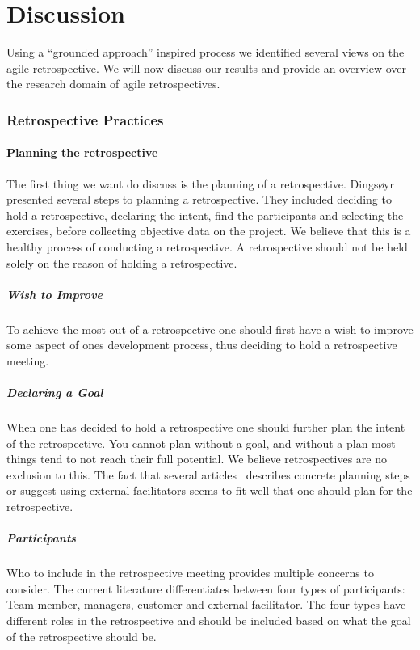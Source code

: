\documentclass[12pt]{article}
\begin{document}
\clearpage

\part{Discussion}
Using a ``grounded approach'' inspired process we identified several views on the agile retrospective. We will now discuss our results and provide an overview over the research domain of agile retrospectives.

\section{Retrospective Practices}
\subsection{Planning the retrospective}
The first thing we want do discuss is the planning of a retrospective. Dingsøyr~\cite{Dingsoyr2005} presented several steps to planning a retrospective. They included deciding to hold a retrospective, declaring the intent, find the participants and selecting the exercises, before collecting objective data on the project. We believe that this is a healthy process of conducting a retrospective. A retrospective should not be held solely on the reason of holding a retrospective. 

\subsubsection{Wish to Improve} 
To achieve the most out of a retrospective one should first have a wish to improve some aspect of ones development process, thus deciding to hold a retrospective meeting. 

\subsubsection{Declaring a Goal}
When one has decided to hold a retrospective one should further plan the intent of the retrospective. You cannot plan without a goal, and without a plan most things tend to not reach their full potential. We believe retrospectives are no exclusion to this. The fact that several articles~\cite{Dingsoyr2005, Bjornson2009, Hanssen2003, Maham2008, Birk2002, Moe2001} describes concrete planning steps or suggest using external facilitators seems to fit well that one should plan for the retrospective. 

\subsubsection{Participants}
Who to include in the retrospective meeting provides multiple concerns to consider. The current literature differentiates between four types of participants: Team member, managers, customer and external facilitator. The four types have different roles in the retrospective and should be included based on what the goal of the retrospective should be. 
\end{document}
